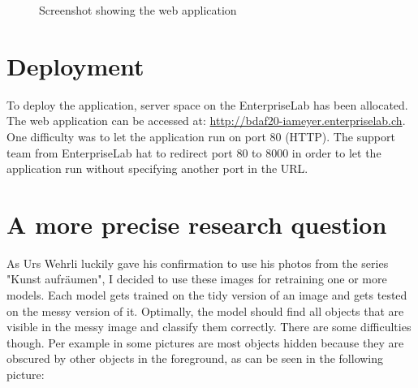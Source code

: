 \begin{figure}[H]
	\caption{\label{fig:web-app-ui} Screenshot showing the web application}
\end{figure}

\section{Deployment}

To deploy the application, server space on the EnterpriseLab has been allocated. The web application can be accessed at: \url{http://bdaf20-iameyer.enterpriselab.ch}. One difficulty was to let the application run on port 80 (HTTP). The support team from EnterpriseLab hat to redirect port 80 to 8000 in order to let the application run without specifying another port in the URL.

\section{A more precise research question}

As Urs Wehrli luckily gave his confirmation to use his photos from the series "Kunst aufräumen", I decided to use these images for retraining one or more models. Each model gets trained on the tidy version of an image and gets tested on the messy version of it. Optimally, the model should find all objects that are visible in the messy image and classify them correctly. There are some difficulties though. Per example in some pictures are most objects hidden because they are obscured by other objects in the foreground, as can be seen in the following picture:

